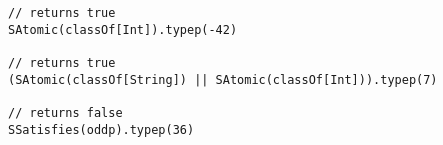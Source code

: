 \begin{lstlisting}[style=reclojureScala]
// returns true
SAtomic(classOf[Int]).typep(-42) 

// returns true
(SAtomic(classOf[String]) || SAtomic(classOf[Int])).typep(7)

// returns false
SSatisfies(oddp).typep(36)
\end{lstlisting}
